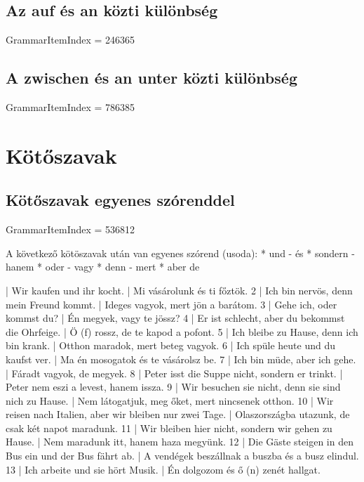 \documentclass{article}
\newenvironment{desc}{\verbatim}{\endverbatim}
\newenvironment{exmp}{\verbatim}{\endverbatim}
\begin{document}
\subsection{Az auf és an közti különbség}

GrammarItemIndex = 246365

\subsection{A zwischen és an unter közti különbség}

GrammarItemIndex = 786385

\section{Kötőszavak}

\subsection{Kötőszavak egyenes szórenddel}

GrammarItemIndex = 536812

\begin{desc}
A következő kötöszavak után van egyenes szórend (usoda):
* und - és
* sondern - hanem
* oder - vagy
* denn - mert
* aber  de
\end{desc}

\begin{exmp}
1 | Wir kaufen und ihr kocht. | Mi vásárolunk és ti főztök.
2 | Ich bin nervös, denn mein Freund kommt. | Ideges vagyok, mert jön a barátom.
3 | Gehe ich, oder kommst du? | Én megyek, vagy te jössz?
4 | Er ist schlecht, aber du bekommst die Ohrfeige. | Ö (f) rossz, de te kapod a pofont.
5 | Ich bleibe zu Hause, denn ich bin krank. | Otthon maradok, mert beteg vagyok.
6 | Ich spüle heute und du kaufst ver. | Ma én mosogatok és te vásárolsz be.
7 | Ich bin müde, aber ich gehe. | Fáradt vagyok, de megyek.
8 | Peter isst die Suppe nicht, sondern er trinkt. | Peter nem eszi a levest, hanem issza.
9 | Wir besuchen sie nicht, denn sie sind nich zu Hause. | Nem látogatjuk, meg őket, mert nincsenek otthon.
10 | Wir reisen nach Italien, aber wir bleiben nur zwei Tage. | Olaszországba utazunk, de csak két napot maradunk.
11 | Wir bleiben hier nicht, sondern wir gehen zu Hause. | Nem maradunk itt, hanem haza megyünk.
12 | Die Gäste steigen in den Bus ein und der Bus fährt ab. | A vendégek beszállnak a buszba és a busz elindul.
13 | Ich arbeite und sie hört Musik. | Én dolgozom és ő (n) zenét hallgat.
\end{exmp}
\end{document}
